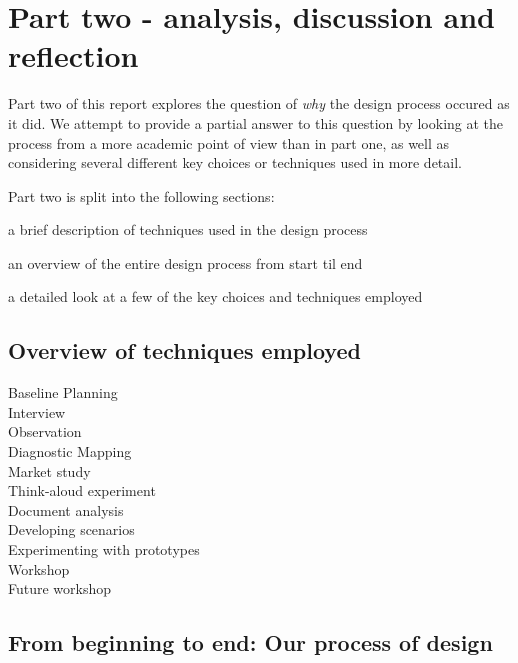 \section{Part two - analysis, discussion and reflection}

Part two of this report explores the question of \textit{why}
the design process occured as it did. We attempt to provide a
partial answer to this question by looking at the process from
a more academic point of view than in part one, as well as considering
several different key choices or techniques used in more detail.

Part two is split into the following sections:
\begin{inparaenum}[i)]
\item a brief description of techniques used in the design process
\item an overview of the entire design process from start til end
\item a detailed look at a few of the key choices and techniques employed
\end{inparaenum}

\subsection{Overview of techniques employed}

\begin{description}
    \item [Baseline Planning]
    \item [Interview]
    \item [Observation]
    \item [Diagnostic Mapping]
    \item [Market study]
    \item [Think-aloud experiment]
    \item [Document analysis]
    \item [Developing scenarios]
    \item [Experimenting with prototypes]
    \item [Workshop]
    \item [Future workshop]
\end{description}

\subsection{From beginning to end: Our process of design}

